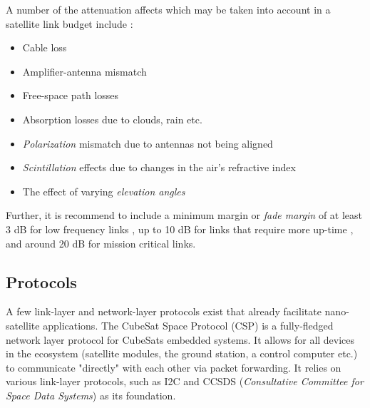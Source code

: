 A number of the attenuation affects which may be taken into account in a satellite link budget include \cite{design-satelliteLinkBudget}:
\begin{itemize}
    \item Cable loss
    \item Amplifier-antenna mismatch
    \item Free-space path losses
    \item Absorption losses due to clouds, rain etc.
    \item \textit{Polarization} mismatch due to antennas not being aligned
    \item \textit{Scintillation} effects due to changes in the air's refractive index
    \item The effect of varying \textit{elevation angles}
\end{itemize}

\noindent Further, it is recommend to include a minimum margin or \textit{fade margin} of at least 3 dB for low frequency links \cite{paper-linkMargin}, up to 10 dB for links that require more up-time \cite{design-linkBudgetDesign}, and around 20 dB for mission critical links.

\subsection{Protocols}
A few link-layer and network-layer protocols exist that already facilitate nano-satellite applications. The CubeSat Space Protocol (CSP) \cite{standard-csp} is a fully-fledged network layer protocol for CubeSats embedded systems. It allows for all devices in the ecosystem (satellite modules, the ground station, a control computer etc.) to communicate "directly" with each other via packet forwarding. It relies on various link-layer protocols, such as I2C and CCSDS (\textit{Consultative Committee for Space Data Systems}) as its foundation.